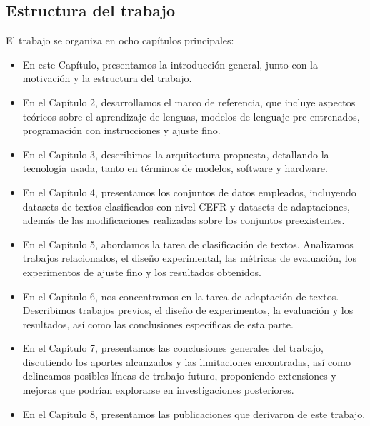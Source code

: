 \subsection{Estructura del trabajo}
El trabajo se organiza en ocho capítulos principales:
\begin{itemize}
\item En este Capítulo, presentamos la introducción general, junto con la motivación y la estructura del trabajo.
\item En el Capítulo 2, desarrollamos el marco de referencia, que incluye aspectos teóricos sobre el aprendizaje de lenguas, modelos de lenguaje pre-entrenados, programación con instrucciones y ajuste fino.
\item En el Capítulo 3, describimos la arquitectura propuesta, detallando la tecnología usada, tanto en términos de modelos, software y hardware.
\item En el Capítulo 4, presentamos los conjuntos de datos empleados, incluyendo datasets de textos clasificados con nivel CEFR y datasets de adaptaciones, además de las modificaciones realizadas sobre los conjuntos preexistentes.
\item En el Capítulo 5, abordamos la tarea de clasificación de textos. Analizamos trabajos relacionados, el diseño experimental, las métricas de evaluación, los experimentos de ajuste fino y los resultados obtenidos.
\item En el Capítulo 6, nos concentramos en la tarea de adaptación de textos. Describimos trabajos previos, el diseño de experimentos, la evaluación y los resultados, así como las conclusiones específicas de esta parte.
\item En el Capítulo 7, presentamos las conclusiones generales del trabajo, discutiendo los aportes alcanzados y las limitaciones encontradas, así como delineamos posibles líneas de trabajo futuro, proponiendo extensiones y mejoras que podrían explorarse en investigaciones posteriores.
\item En el Capítulo 8, presentamos las publicaciones que derivaron de este trabajo.
\end{itemize}